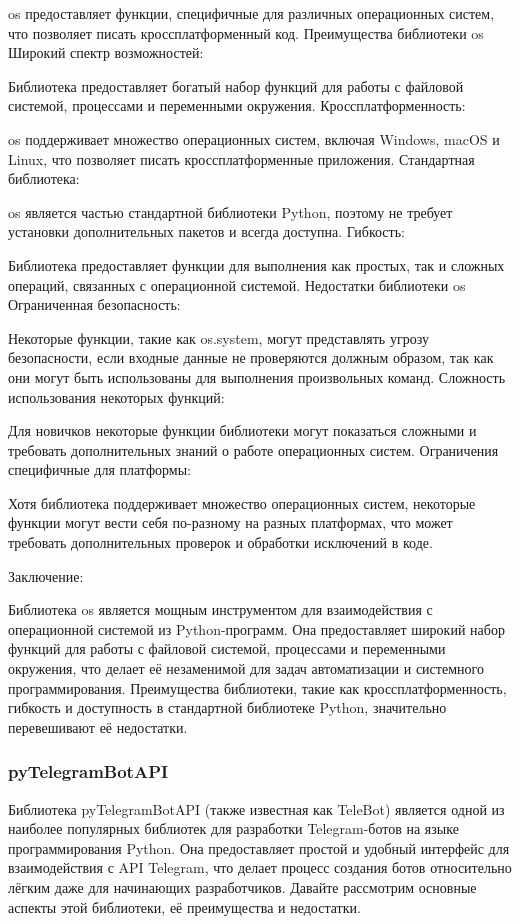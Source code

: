 os предоставляет функции, специфичные для различных операционных систем, что позволяет писать кроссплатформенный код.
Преимущества библиотеки os
Широкий спектр возможностей:

Библиотека предоставляет богатый набор функций для работы с файловой системой, процессами и переменными окружения.
Кроссплатформенность:

os поддерживает множество операционных систем, включая Windows, macOS и Linux, что позволяет писать кроссплатформенные приложения.
Стандартная библиотека:

os является частью стандартной библиотеки Python, поэтому не требует установки дополнительных пакетов и всегда доступна.
Гибкость:

Библиотека предоставляет функции для выполнения как простых, так и сложных операций, связанных с операционной системой.
Недостатки библиотеки os
Ограниченная безопасность:

Некоторые функции, такие как os.system, могут представлять угрозу безопасности, если входные данные не проверяются должным образом, так как они могут быть использованы для выполнения произвольных команд.
Сложность использования некоторых функций:

Для новичков некоторые функции библиотеки могут показаться сложными и требовать дополнительных знаний о работе операционных систем.
Ограничения специфичные для платформы:

Хотя библиотека поддерживает множество операционных систем, некоторые функции могут вести себя по-разному на разных платформах, что может требовать дополнительных проверок и обработки исключений в коде.

Заключение:

Библиотека os является мощным инструментом для взаимодействия с операционной системой из Python-программ. Она предоставляет широкий набор функций для работы с файловой системой, процессами и переменными окружения, что делает её незаменимой для задач автоматизации и системного программирования. Преимущества библиотеки, такие как кроссплатформенность, гибкость и доступность в стандартной библиотеке Python, значительно перевешивают её недостатки.
\subsubsection{pyTelegramBotAPI}

Библиотека pyTelegramBotAPI (также известная как TeleBot) является одной из наиболее популярных библиотек для разработки Telegram-ботов на языке программирования Python. Она предоставляет простой и удобный интерфейс для взаимодействия с API Telegram, что делает процесс создания ботов относительно лёгким даже для начинающих разработчиков. Давайте рассмотрим основные аспекты этой библиотеки, её преимущества и недостатки.

